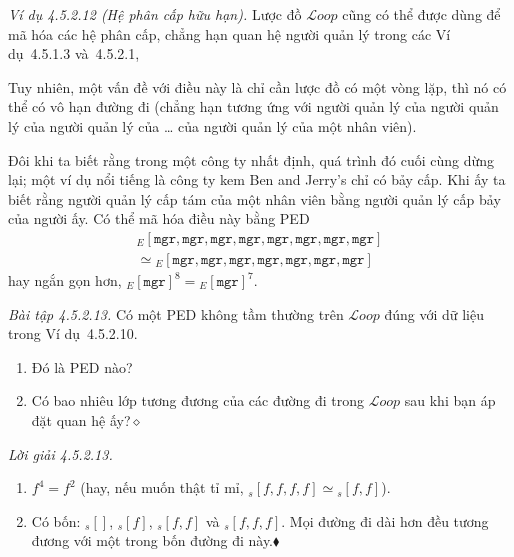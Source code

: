 \noindent\textit{Ví dụ 4.5.2.12 (Hệ phân cấp hữu hạn).}\keepwithnext
Lược đồ $\mathcal{L}oop$ cũng có thể được dùng để mã hóa các hệ phân cấp, chẳng hạn quan hệ người quản lý trong các Ví dụ~4.5.1.3 và~4.5.2.1,
\begin{center}
\end{center}
Tuy nhiên, một vấn đề với điều này là chỉ cần lược đồ có một vòng lặp, thì nó có thể có vô hạn đường đi (chẳng hạn tương ứng với người quản lý của người quản lý của người quản lý của \ldots{} của người quản lý của một nhân viên).

Đôi khi ta biết rằng trong một công ty nhất định, quá trình đó cuối cùng dừng lại; một ví dụ nổi tiếng là công ty kem Ben and Jerry's chỉ có bảy cấp. Khi ấy ta biết rằng người quản lý cấp tám của một nhân viên bằng người quản lý cấp bảy của người ấy. Có thể mã hóa điều này bằng PED
\[
\begin{gathered}
{}_E[\texttt{mgr},\texttt{mgr},\texttt{mgr},\texttt{mgr},\texttt{mgr},\texttt{mgr},\texttt{mgr},\texttt{mgr}]\\
\simeq{}_E[\texttt{mgr},\texttt{mgr},\texttt{mgr},\texttt{mgr},\texttt{mgr},\texttt{mgr},\texttt{mgr}]
\end{gathered}
\]
hay ngắn gọn hơn, ${}_E[\texttt{mgr}]^8={}_E[\texttt{mgr}]^7$.

\noindent\textit{Bài tập 4.5.2.13.}\keepwithnext
Có một PED không tầm thường trên $\mathcal{L}oop$ đúng với dữ liệu trong Ví dụ~4.5.2.10.
\begin{enumerate}[label=\alph*.]
\item Đó là PED nào?
\item Có bao nhiêu lớp tương đương của các đường đi trong $\mathcal{L}oop$ sau khi bạn áp đặt quan hệ ấy?\nobreak\hfill$\diamond$
\end{enumerate}

\noindent\textit{Lời giải 4.5.2.13.}\keepwithnext
\begin{enumerate}[label=\alph*.]
\item $f^4=f^2$ (hay, nếu muốn thật tỉ mỉ, ${}_s[f,f,f,f]\simeq{}_s[f,f]$).
\item Có bốn: ${}_s[]$, ${}_s[f]$, ${}_s[f,f]$ và ${}_s[f,f,f]$. Mọi đường đi dài hơn đều tương đương với một trong bốn đường đi này.\nobreak\hfill$\blacklozenge$
\end{enumerate}

